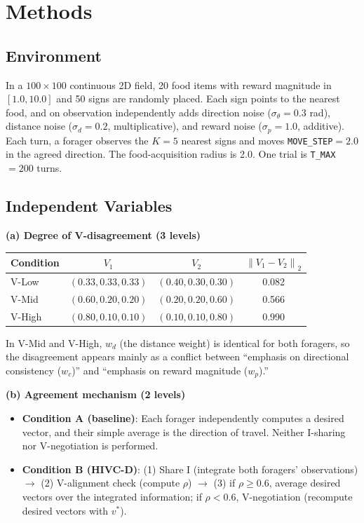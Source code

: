 \documentclass[11pt]{article}
\newcommand{\norm}[1]{\ensuremath{\lVert #1 \rVert}}
\begin{document}
\section{Methods}

\subsection{Environment}

In a $100\times100$ continuous 2D field, 20 food items with reward magnitude in $[1.0, 10.0]$ and 50 signs are randomly placed. Each sign points to the nearest food, and on observation independently adds direction noise ($\sigma_\theta=0.3$ rad), distance noise ($\sigma_d=0.2$, multiplicative), and reward noise ($\sigma_p=1.0$, additive). Each turn, a forager observes the $K=5$ nearest signs and moves \texttt{MOVE\_STEP}$=2.0$ in the agreed direction. The food-acquisition radius is 2.0. One trial is \texttt{T\_MAX}$=200$ turns.

\subsection{Independent Variables}

\textbf{(a) Degree of V-disagreement (3 levels)}

\begin{longtable}{@{}l c c c@{}}
\toprule
Condition & $V_1$ & $V_2$ & $\norm{V_1-V_2}_2$ \\
\midrule
V-Low  & $(0.33, 0.33, 0.33)$ & $(0.40, 0.30, 0.30)$ & 0.082 \\
V-Mid  & $(0.60, 0.20, 0.20)$ & $(0.20, 0.20, 0.60)$ & 0.566 \\
V-High & $(0.80, 0.10, 0.10)$ & $(0.10, 0.10, 0.80)$ & 0.990 \\
\bottomrule
\end{longtable}

In V-Mid and V-High, $w_d$ (the distance weight) is identical for both foragers, so the disagreement appears mainly as a conflict between ``emphasis on directional consistency ($w_c$)'' and ``emphasis on reward magnitude ($w_p$).''

\textbf{(b) Agreement mechanism (2 levels)}

\begin{itemize}[nosep]
  \item \textbf{Condition A (baseline)}: Each forager independently computes a desired vector, and their simple average is the direction of travel. Neither I-sharing nor V-negotiation is performed.
  \item \textbf{Condition B (HIVC-D)}: (1) Share I (integrate both foragers' observations) $\to$ (2) V-alignment check (compute $\rho$) $\to$ (3) if $\rho\ge0.6$, average desired vectors over the integrated information; if $\rho<0.6$, V-negotiation (recompute desired vectors with $v^*$).
\end{itemize}
\end{document}
